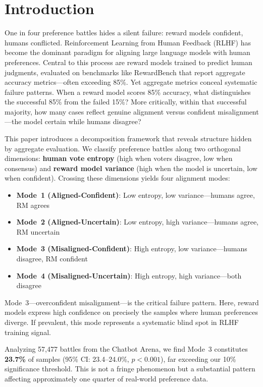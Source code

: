 \section{Introduction}

One in four preference battles hides a silent failure: reward models confident, humans conflicted. Reinforcement Learning from Human Feedback (RLHF) has become the dominant paradigm for aligning large language models with human preferences. Central to this process are reward models trained to predict human judgments, evaluated on benchmarks like RewardBench that report aggregate accuracy metrics---often exceeding 85\%. Yet aggregate metrics conceal systematic failure patterns. When a reward model scores 85\% accuracy, what distinguishes the successful 85\% from the failed 15\%? More critically, within that successful majority, how many cases reflect genuine alignment versus confident misalignment---the model certain while humans disagree?

This paper introduces a decomposition framework that reveals structure hidden by aggregate evaluation. We classify preference battles along two orthogonal dimensions: \textbf{human vote entropy} (high when voters disagree, low when consensus) and \textbf{reward model variance} (high when the model is uncertain, low when confident). Crossing these dimensions yields four alignment modes:

\begin{itemize}
    \item \textbf{Mode~1 (Aligned-Confident)}: Low entropy, low variance---humans agree, RM agrees
    \item \textbf{Mode~2 (Aligned-Uncertain)}: Low entropy, high variance---humans agree, RM uncertain
    \item \textbf{Mode~3 (Misaligned-Confident)}: High entropy, low variance---humans disagree, RM confident
    \item \textbf{Mode~4 (Misaligned-Uncertain)}: High entropy, high variance---both disagree
\end{itemize}

Mode~3---overconfident misalignment---is the critical failure pattern. Here, reward models express high confidence on precisely the samples where human preferences diverge. If prevalent, this mode represents a systematic blind spot in RLHF training signal.

Analyzing 57,477 battles from the Chatbot Arena, we find Mode~3 constitutes \textbf{23.7\%} of samples (95\% CI: 23.4--24.0\%, $p<0.001$), far exceeding our 10\% significance threshold. This is not a fringe phenomenon but a substantial pattern affecting approximately one quarter of real-world preference data.

